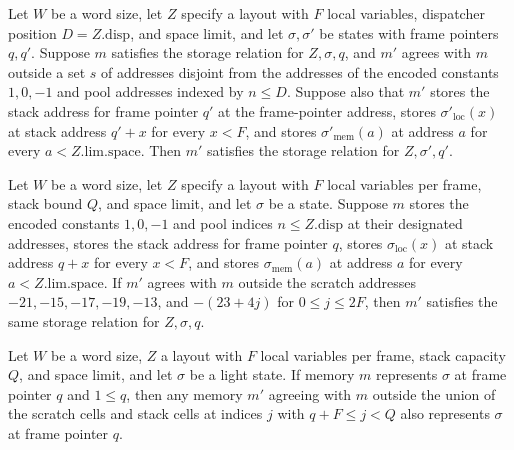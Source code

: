 \begin{theorem}
\label{Light.Compiler.Rel.of_agreeOutside}
\leanok
{}
Let $W$ be a word size, let $Z$ specify a layout with $F$ local variables, dispatcher
position $D=Z.\mathrm{disp}$, and space limit, and let $\sigma,\sigma'$ be states with
frame pointers $q,q'$. Suppose $m$ satisfies the storage relation for $Z,\sigma,q$, and
$m'$ agrees with $m$ outside a set $s$ of addresses disjoint from the addresses of the
encoded constants $1,0,-1$ and pool addresses indexed by $n\le D$. Suppose also that
$m'$ stores the stack address for frame pointer $q'$ at the frame-pointer address,
stores $\sigma'_{\mathrm{loc}}(x)$ at stack address $q'+x$ for every $x<F$, and stores
$\sigma'_{\mathrm{mem}}(a)$ at address $a$ for every $a<Z.\mathrm{lim}.\mathrm{space}$.
Then $m'$ satisfies the storage relation for $Z,\sigma',q'$.
\end{theorem}

\begin{theorem}
\label{Light.Compiler.Rel.same}
\leanok
{}
Let $W$ be a word size, let $Z$ specify a layout with $F$ local variables per frame,
stack bound $Q$, and space limit, and let $\sigma$ be a state. Suppose $m$ stores the
encoded constants $1,0,-1$ and pool indices $n\le Z.\mathrm{disp}$ at their designated
addresses, stores the stack address for frame pointer $q$, stores
$\sigma_{\mathrm{loc}}(x)$ at stack address $q+x$ for every $x<F$, and stores
$\sigma_{\mathrm{mem}}(a)$ at address $a$ for every $a<Z.\mathrm{lim}.\mathrm{space}$.
If $m'$ agrees with $m$ outside the scratch addresses $-21,-15,-17,-19,-13$, and
$-(23+4j)$ for $0\le j\le 2F$, then $m'$ satisfies the same storage relation for
$Z,\sigma,q$.
\end{theorem}

\begin{theorem}
\label{Light.Compiler.Rel.beyond}
\leanok
{}
Let $W$ be a word size, $Z$ a layout with $F$ local variables per frame, stack capacity $Q$,
and space limit, and let $\sigma$ be a light state. If memory $m$ represents $\sigma$ at
frame pointer $q$ and $1\le q$, then any memory $m\prime$ agreeing with $m$ outside the
union of the scratch cells and stack cells at indices $j$ with $q+F\le j<Q$ also
represents $\sigma$ at frame pointer $q$.
\end{theorem}

